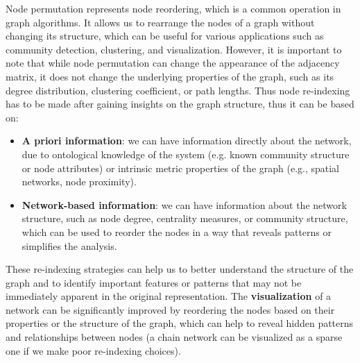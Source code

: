 \begin{remark}[Re-indexing]
    Node permutation represents node reordering, which is a common operation in graph algorithms. It allows us to rearrange the nodes of a graph without changing its structure, which can be useful for various applications such as community detection, clustering, and visualization. However, it is important to note that while node permutation can change the appearance of the adjacency matrix, it does not change the underlying properties of the graph, such as its degree distribution, clustering coefficient, or path lengths. Thus node re-indexing has to be made after gaining insights on the graph structure, thus it can be based on:
    \begin{itemize}
        \item \textbf{A priori information}: we can have information directly about the network, due to ontological knowledge of the system (e.g. known community structure or node attributes) or intrinsic metric properties of the graph (e.g., spatial networks, node proximity).
        \item \textbf{Network-based information}: we can have information about the network structure, such as node degree, centrality measures, or community structure, which can be used to reorder the nodes in a way that reveals patterns or simplifies the analysis.
    \end{itemize}
\end{remark}
These re-indexing strategies can help us to better understand the structure of the graph and to identify important features or patterns that may not be immediately apparent in the original representation. The \textbf{visualization} of a network can be significantly improved by reordering the nodes based on their properties or the structure of the graph, which can help to reveal hidden patterns and relationships between nodes (a chain network can be visualized as a sparse one if we make poor re-indexing choices).

